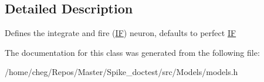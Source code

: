 \subsection{Detailed Description}
Defines the integrate and fire (\hyperlink{classIF}{IF}) neuron, defaults to perfect \hyperlink{classIF}{IF} 

The documentation for this class was generated from the following file\+:\begin{DoxyCompactItemize}
\item 
/home/cheg/\+Repos/\+Master/\+Spike\+\_\+doctest/src/\+Models/models.\+h\end{DoxyCompactItemize}
